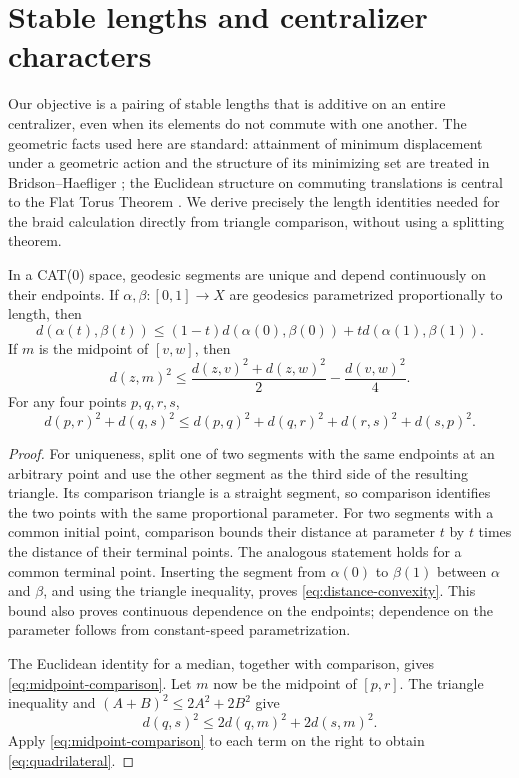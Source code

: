 \section{Stable lengths and centralizer characters}\label{sec:lengths}

Our objective is a pairing of stable lengths that is additive on an
entire centralizer, even when its elements do not commute with one
another.  The geometric facts used here are standard: attainment of minimum
displacement under a geometric action and the structure of its
minimizing set are treated in Bridson--Haefliger
\cite[II.6.8(5) and II.6.10(2)]{BridsonHaefliger1999}; the Euclidean structure
on commuting translations is central to the Flat Torus Theorem
\cite[II.7.1]{BridsonHaefliger1999}.  We derive precisely the length
identities needed for the braid calculation directly from triangle
comparison, without using a splitting theorem.

\begin{lemma}\label{lem:comparison}
In a CAT(0) space, geodesic segments are unique and depend continuously on
their endpoints.  If $\alpha,\beta:[0,1]\to X$ are geodesics parametrized
proportionally to length, then
\begin{equation}\label{eq:distance-convexity}
 d(\alpha(t),\beta(t))
 \le (1-t)d(\alpha(0),\beta(0))+t d(\alpha(1),\beta(1)).
\end{equation}
If $m$ is the midpoint of $[v,w]$, then
\begin{equation}\label{eq:midpoint-comparison}
 d(z,m)^2\le \frac{d(z,v)^2+d(z,w)^2}{2}
                    -\frac{d(v,w)^2}{4}.
\end{equation}
For any four points $p,q,r,s$,
\begin{equation}\label{eq:quadrilateral}
 d(p,r)^2+d(q,s)^2
 \le d(p,q)^2+d(q,r)^2+d(r,s)^2+d(s,p)^2.
\end{equation}
\end{lemma}

\begin{proof}
For uniqueness, split one of two segments with the same endpoints at an
arbitrary point and use the other segment as the third side of the resulting
triangle.  Its comparison triangle is a straight segment, so comparison
identifies the two points with the same proportional parameter.  For two
segments with a common initial point, comparison bounds their distance at
parameter $t$ by $t$ times the distance of their terminal points.  The
analogous statement holds for a common terminal point.  Inserting the
segment from $\alpha(0)$ to $\beta(1)$ between $\alpha$ and $\beta$, and
using the triangle inequality, proves \eqref{eq:distance-convexity}.
This bound also proves continuous dependence on the endpoints; dependence
on the parameter follows from constant-speed parametrization.

The Euclidean identity for a median, together with comparison, gives
\eqref{eq:midpoint-comparison}.  Let $m$ now be the midpoint of $[p,r]$.
The triangle inequality and $(A+B)^2\le 2A^2+2B^2$ give
\[
 d(q,s)^2\le 2d(q,m)^2+2d(s,m)^2.
\]
Apply \eqref{eq:midpoint-comparison} to each term on the right to obtain
\eqref{eq:quadrilateral}.
\end{proof}


